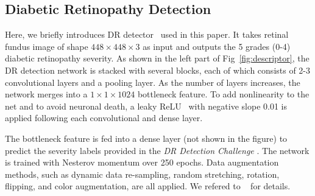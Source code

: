 \documentclass[letterpaper]{article} %
\begin{document}
	\subsection{Diabetic Retinopathy Detection}
  Here, we  briefly introduces  DR detector~\cite{oO2016detector} used in this paper. It takes retinal fundus image of shape $448 \times 448 \times 3$ as input  and outputs the 5 grades (0-4) diabetic retinopathy severity.
   As shown in the left part of Fig~\ref{fig:descriptor}, the DR detection network is stacked with several blocks, each of which consists of 2-3 convolutional layers and a pooling layer. As the number of layers increases, the network merges into a  $ 1\times 1 \times 1024$ bottleneck feature. To add nonlinearity to the net and to avoid neuronal death, a leaky ReLU~\cite{maas2013rectifier} with negative slope 0.01 is applied following each convolutional and dense layer.
   
   The bottleneck feature is fed into a dense layer (not shown in the figure) to predict the severity labels provided in the \textit{DR Detection Challenge} \cite{kaggle2016diabetic}. The network is trained with Nesterov momentum over 250 epochs. Data augmentation methods, such as dynamic data re-sampling, random stretching, rotation, flipping, and color augmentation, are all applied. We refered to ~\cite{oO2016detector} for details.
   
   
     
   
   
   
   
   
   
   
  
  
	
	 
	
\end{document}

